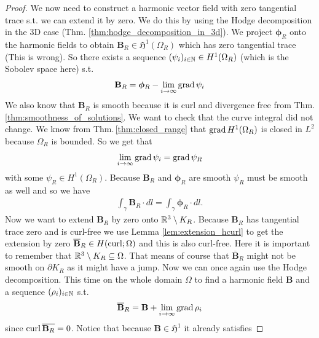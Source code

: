\documentclass[../main.tex]{subfiles}
\begin{document}
\begin{proof}
    We now need to construct a harmonic vector field with zero tangential trace
    s.t. we can extend it by zero. We do this by using the Hodge 
    decomposition in the $3$D case (Thm. \ref{thm:hodge_decomposition_in_3d}).
    We project $\bm{\phi}_R$ onto the harmonic fields to obtain $\mathbf{B}_R \in \mathfrak{H}^1(\Omega_R)$ 
    {\color{red} which has zero 
    tangential trace (This is wrong)}. So there exists a sequence 
    $(\psi_i)_{i \in \mathbb{N}} \in H^1(\Omega_R)$ (which is the Sobolev space here) s.t.
    \begin{align*}
        \mathbf{B}_R = \bm{\phi}_R - \lim\limits_{i\rightarrow \infty}\operatorname{grad} \psi_i
    \end{align*}
    We also know that $\mathbf{B}_R$ is smooth because 
    it is curl and divergence free from Thm.\ref{thm:smoothness_of_solutions}. 
    We want to check that the curve
    integral did not change. We know from Thm.\,\ref{thm:closed_range} 
    that $\operatorname{grad} H^1(\Omega_R)$ is closed in $L^2$ because $\Omega_R$ is bounded. 
    So we get that 
    \begin{align*}
        \lim\limits_{i\rightarrow \infty}\operatorname{grad} \psi_i = \operatorname{grad} \psi_R
    \end{align*}
    with some $\psi_R \in H^1(\Omega_R)$. Because $\mathbf{B}_R$ and $\bm{\phi}_R$ are smooth
    $\psi_R$ must be smooth as well and so we have   
    \begin{align*}
        \int_\gamma \mathbf{B}_R\cdot dl = \int_\gamma \bm{\phi}_R\cdot dl.
    \end{align*}
    Now we want to extend $\mathbf{B}_R$ by zero onto $\mathbb{R}^3 \setminus K_R$.
    Because $\mathbf{B}_R$ has tangential trace zero and is curl-free we use 
    Lemma \ref{lem:extension_hcurl} to get the extension by zero
    $\overline{\mathbf{B}}_R \in H(\operatorname{curl};\Omega)$ and this is also curl-free. 
    Here it is important to remember 
    that $\mathbb{R}^3 \setminus K_R \subseteq \Omega$. 
    That means of course that $\overline{\mathbf{B}}_R$ 
    might not be smooth on $\partial K_R$ 
    as it might have a jump. 
    Now we can once again use the Hodge 
    decomposition. This time on the whole domain $\Omega$ to find 
    a harmonic field $\mathbf{B}$ and a sequence $(\rho_i)_{i\in \mathbb{N}}$
    s.t.
    \begin{align*}
        \overline{\mathbf{B}}_R = \mathbf{B} 
            +\lim\limits_{i\rightarrow \infty}\operatorname{grad} \rho_i
    \end{align*}
    since $\operatorname{curl} \overline{\mathbf{B}_R} = 0$.
    Notice that because $\mathbf{B} \in \mathfrak{H}^1$ it already satisfies 

\end{proof}
\end{document}
